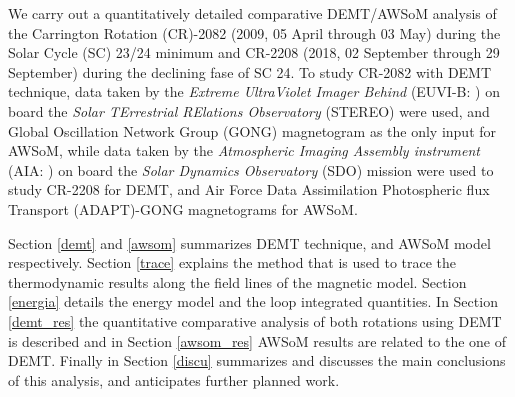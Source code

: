 \documentclass[namedreferences]{solarphysics}
\renewcommand{\deg}{$^\circ$}
\newcommand{\rsun}{R{$_\odot$}}
\newcommand{\mrsun}{{\rm R_\odot}}
\begin{document}
\begin{article}
We carry out a quantitatively detailed comparative {DEMT/AWSoM} analysis of the Carrington Rotation (CR)-2082 (2009, 05 April through 03 May) during the Solar Cycle (SC) 23/24 minimum and CR-2208 (2018, 02 September through 29 September) during the declining fase of SC 24. To study CR-2082 with DEMT technique, data taken by the \textit{Extreme UltraViolet Imager Behind} {(EUVI-B: \citealt{wuelser_2004})} on board the \textit{Solar TErrestrial RElations Observatory} (STEREO) were used, and Global Oscillation Network Group (GONG) magnetogram as the only input for AWSoM, while data taken by the \textit{Atmospheric Imaging Assembly instrument} {(AIA: \citealt{lemen_2012})} on board the \textit{Solar Dynamics Observatory} (SDO) mission were used to study CR-2208 {for DEMT, and Air Force Data Assimilation Photospheric flux Transport (ADAPT)-GONG magnetograms for AWSoM}.



Section \ref{demt} and \ref{awsom} summarizes DEMT technique, and  AWSoM model respectively. Section \ref{trace} explains the method that is used to trace the thermodynamic results along the field lines of the magnetic model. Section \ref{energia} details the energy model and the loop integrated quantities. In Section \ref{demt_res} the quantitative comparative analysis of both rotations using DEMT is described and in Section \ref{awsom_res} AWSoM results are related to the one of DEMT. Finally in Section \ref{discu} summarizes and discusses the main conclusions of this analysis, and anticipates further planned work.



\end{article}
\end{document}
